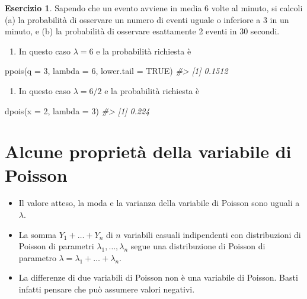 \documentclass[
  11pt,
]{krantz}
\makeatletter
\newenvironment{Shaded}{\begin{snugshade}}{\end{snugshade}}
\newcommand{\AttributeTok}[1]{\textcolor[rgb]{0.61,0.61,0.61}{#1}}
\newcommand{\CommentTok}[1]{\textcolor[rgb]{0.37,0.37,0.37}{\textit{#1}}}
\newcommand{\ConstantTok}[1]{\textcolor[rgb]{0,0,0}{#1}}
\newcommand{\DecValTok}[1]{\textcolor[rgb]{0.06,0.06,0.06}{#1}}
\newcommand{\FunctionTok}[1]{\textcolor[rgb]{0,0,0}{#1}}
\newcommand{\NormalTok}[1]{#1}
\providecommand{\tightlist}{%
  \setlength{\itemsep}{0pt}\setlength{\parskip}{0pt}}
\newenvironment{kframe}{%
\medskip{}
\setlength{\fboxsep}{.8em}
 \def\at@end@of@kframe{}%
 \ifinner\ifhmode%
  \def\at@end@of@kframe{\end{minipage}}%
  \begin{minipage}{\columnwidth}%
 \fi\fi%
 \def\FrameCommand##1{\hskip\@totalleftmargin \hskip-\fboxsep
 \colorbox{shadecolor}{##1}\hskip-\fboxsep
     \hskip-\linewidth \hskip-\@totalleftmargin \hskip\columnwidth}%
 \MakeFramed {\advance\hsize-\width
   \@totalleftmargin\z@ \linewidth\hsize
   \@setminipage}}%
 {\par\unskip\endMakeFramed%
 \at@end@of@kframe}
\renewenvironment{Shaded}{\begin{kframe}}{\end{kframe}}
\theoremstyle{definition}
\theoremstyle{definition}
\theoremstyle{definition}
\newtheorem{exercise}{Esercizio}[chapter]
\theoremstyle{definition}
\theoremstyle{remark}
\makeatother
\begin{document}
\begin{exercise}

Sapendo che un evento avviene in media 6 volte al minuto, si calcoli (a) la probabilità di osservare un numero di eventi uguale o inferiore a 3 in un minuto, e (b) la probabilità di osservare esattamente 2 eventi in 30 secondi.

\begin{enumerate}
\def\labelenumi{(\alph{enumi})}
\tightlist
\item
  In questo caso \(\lambda = 6\) e la probabilità richiesta è
\end{enumerate}

\begin{Shaded}
\begin{Highlighting}[]
\FunctionTok{ppois}\NormalTok{(}\AttributeTok{q =} \DecValTok{3}\NormalTok{, }\AttributeTok{lambda =} \DecValTok{6}\NormalTok{, }\AttributeTok{lower.tail =} \ConstantTok{TRUE}\NormalTok{)}
\CommentTok{\#\textgreater{} [1] 0.1512}
\end{Highlighting}
\end{Shaded}

\begin{enumerate}
\def\labelenumi{(\alph{enumi})}
\setcounter{enumi}{1}
\tightlist
\item
  In questo caso \(\lambda = 6 / 2\) e la probabilità richiesta è
\end{enumerate}

\begin{Shaded}
\begin{Highlighting}[]
\FunctionTok{dpois}\NormalTok{(}\AttributeTok{x =} \DecValTok{2}\NormalTok{, }\AttributeTok{lambda =} \DecValTok{3}\NormalTok{)}
\CommentTok{\#\textgreater{} [1] 0.224}
\end{Highlighting}
\end{Shaded}

\end{exercise}

\hypertarget{alcune-proprietuxe0-della-variabile-di-poisson}{%
\section{Alcune proprietà della variabile di Poisson}\label{alcune-proprietuxe0-della-variabile-di-poisson}}

\begin{itemize}
\item
  Il valore atteso, la moda e la varianza della variabile di Poisson sono uguali a \(\lambda\).
\item
  La somma \(Y_1 + \dots + Y_n\) di \(n\) variabili casuali indipendenti con distribuzioni di Poisson di parametri \(\lambda_{1},\dots,\lambda_{n}\) segue una distribuzione di Poisson di parametro \(\lambda = \lambda_{1}+\dots+\lambda_{n}\).
\item
  La differenze di due variabili di Poisson non è una variabile di Poisson. Basti infatti pensare che può assumere valori negativi.
\end{itemize}
\end{document}
